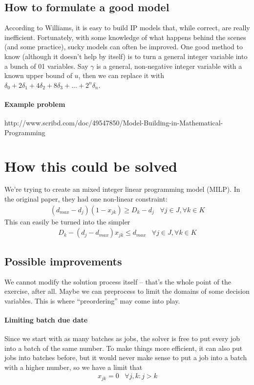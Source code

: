 \documentclass[13pt, letterpaper, twoside]{book}
\begin{document}
\subsection{How to formulate a good model}
According to Williams, it is easy to build IP models that, while correct, are really inefficient. Fortunately, with some knowledge of what happens behind the scenes (and some practice), sucky models can often be improved. One good method to know (although it doesn't help by itself) is to turn a general integer variable into a bunch of 01 variables. Say $\gamma$ is a general, non-negative integer variable with a known upper bound of $u$, then we can replace it with $\delta_0 + 2\delta_1 + 4\delta_2 + 8\delta_3 + \dots + 2^n\delta_n$. 

\paragraph*{Example problem} 
http://www.scribd.com/doc/49547850/Model-Building-in-Mathematical-Programming

\pagebreak
\section{How this could be solved}
We're trying to create an mixed integer linear programming model (MILP). In the original paper, they had one non-linear constraint:
\begin{align}
  (d_{max}-d_j)(1-x_{jk}) \geq D_k-d_j \;\;\;\forall j \in J, \forall k \in K
\end{align}
This can easily be turned into the simpler
\begin{align}
  D_k - (d_j - d_{max})x_{jk} \leq d_{max} \;\;\;\forall j \in J, \forall k \in K
\end{align}
\subsection{Possible improvements}
We cannot modify the solution process itself -- that's the whole point of the exercise, after all. Maybe we can preprocess to limit the domains of some decision variables. This is where ``preordering'' may come into play.
\paragraph{Limiting batch due date}
Since we start with as many batches as jobs, the solver is free to put every job into a batch of the same number. To make things more efficient, it can also put jobs into batches before, but it would never make sense to put a job into a batch with a higher number, so we have a limit that
\begin{align}
  x_{jk} = 0 \;\;\; \forall j,k: j > k
\end{align}
\end{document}
